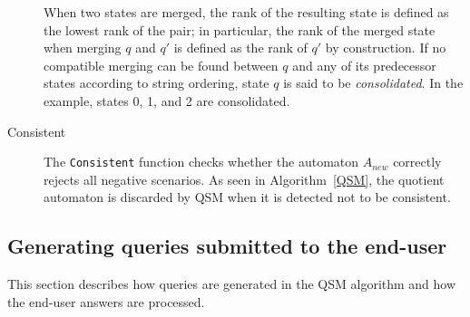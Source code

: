 \begin{description}
When two states are merged, the rank of the resulting state is defined as the lowest rank of the pair; in particular, the rank of the merged state when merging $q$ and $q'$ is defined as the rank of $q'$ by construction. If no compatible merging can be found between $q$ and any of its predecessor states according to string ordering, state $q$ is said to be \textsl{consolidated}. In the example, states 0, 1, and 2 are consolidated.

\item[Consistent] The \texttt{Consistent} function checks whether the automaton $A_{new}$ correctly rejects all negative scenarios. As seen in Algorithm~\ref{QSM}, the quotient automaton is discarded by \textsc{QSM} when it is detected not to be consistent.

\end{description}

\subsection{Generating queries submitted to the end-user\label{QSM:query}}

This section describes how queries are generated in the \textsc{QSM} algorithm and how the end-user answers are processed.

